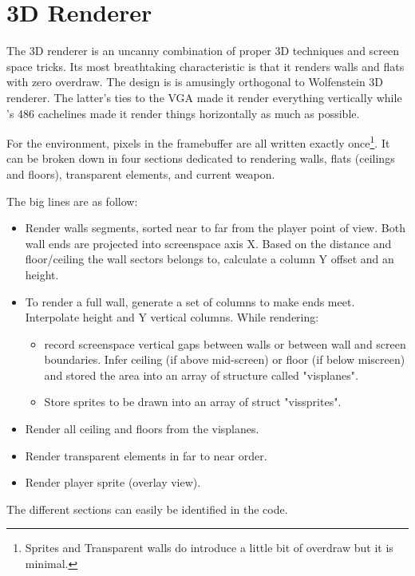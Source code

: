 \section{3D Renderer}
The 3D renderer is an uncanny combination of proper 3D techniques and screen space tricks. Its most breathtaking characteristic is that it renders walls and flats with zero overdraw. The design is is amusingly orthogonal to Wolfenstein 3D renderer. The latter's ties to the VGA made it render everything vertically while \doom's 486 cachelines made it render things horizontally as much as possible.\\
\par
 For the environment, pixels in the framebuffer are all written exactly once\footnote{Sprites and Transparent walls do introduce a little bit of overdraw but it is minimal.}. It can be broken down in four sections dedicated to rendering walls, flats (ceilings and floors), transparent elements, and current weapon.\\
\par
The big lines are as follow:\\
\par
\begin{itemize}
\item Render walls segments, sorted near to far from the player point of view. Both wall ends are projected into screenspace axis X. Based on the distance and floor/ceiling the wall sectors belongs to, calculate a column Y offset and an height. 
\item To render a full wall, generate a set of columns to make ends meet. Interpolate height and Y vertical columns. While rendering:
   \begin{itemize}
     \item record screenspace vertical gaps between walls or between wall and screen boundaries. Infer ceiling (if above mid-screen) or floor (if below miscreen) and stored the area into an array of structure called "visplanes".
     \item Store sprites to be drawn into an array of struct "vissprites".
   \end{itemize}      
\item Render all ceiling and floors from the visplanes.
\item Render transparent elements in far to near order.
\item Render player sprite (overlay view).
\end{itemize}
\par
The different sections can easily be identified in the code.\\
\par
{}
\par
{}

